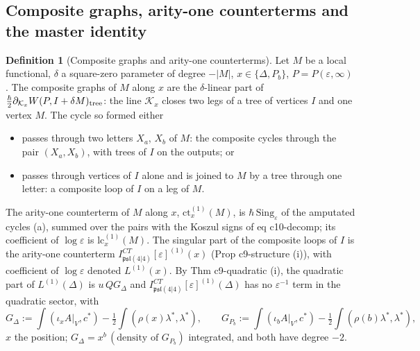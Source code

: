 \documentclass[11pt]{article}
\numberwithin{equation}{section}
\theoremstyle{plain}
\theoremstyle{definition}
\newtheorem{definition}[theorem]{Definition}
\newcommand{\AV}{A|_V}
\begin{document}
\subsection{Composite graphs, arity-one counterterms and the master identity}

\begin{definition}[Composite graphs and arity-one counterterms]
\label{def:cc-graphs}
Let $M$ be a local functional, $\delta$ a square-zero parameter of degree $-|M|$, $x\in\{\Delta,P_b\}$, $P=P(\varepsilon,\infty)$. The composite graphs of $M$ along $x$ are the $\delta$-linear part of $\tfrac\hbar2\partial_{\mathcal K_x}W(P,I+\delta M)_{\rm tree}$: the line $\mathcal K_x$ closes two legs of a tree of vertices $I$ and one vertex $M$. The cycle so formed either
\begin{itemize}
\item[(a)] passes through two letters $X_a$, $X_b$ of $M$: the composite cycles through the pair $(X_a,X_b)$, with trees of $I$ on the outputs; or
\item[(b)] passes through vertices of $I$ alone and is joined to $M$ by a tree through one letter: a composite loop of $I$ on a leg of $M$.
\end{itemize}
The arity-one counterterm of $M$ along $x$, $\mathrm{ct}^{(1)}_x(M)$, is $\hbar\,\mathrm{Sing}_\varepsilon$ of the amputated cycles (a), summed over the pairs with the Koszul signs of eq c10-decomp; its coefficient of $\log\varepsilon$ is $\mathrm{lc}^{(1)}_x(M)$. The singular part of the composite loops of $I$ is the arity-one counterterm $I^{CT}_{\mathfrak{psl}(4|4)}[\varepsilon]^{(1)}(x)$ (Prop c9-structure (i)), with coefficient of $\log\varepsilon$ denoted $L^{(1)}(x)$. By Thm c9-quadratic (i), the quadratic part of $L^{(1)}(\Delta)$ is $u\,QG_\Delta$ and $I^{CT}_{\mathfrak{psl}(4|4)}[\varepsilon]^{(1)}(\Delta)$ has no $\varepsilon^{-1}$ term in the quadratic sector, with
\[
G_\Delta:=\int(\iota_x\AV,c^*)-\tfrac12\int(\rho(x)\lambda^*,\lambda^*),\qquad G_{P_b}:=\int(\iota_b\AV,c^*)-\tfrac12\int(\rho(b)\lambda^*,\lambda^*),
\]
$x$ the position; $G_\Delta=x^b\,(\text{density of }G_{P_b})$ integrated, and both have degree $-2$.
\end{definition}
\end{document}
